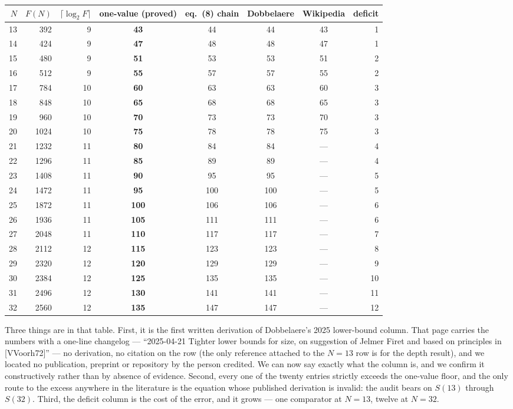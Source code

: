 \documentclass[11pt,a4paper]{article}
\begin{document}
\begin{center}
\footnotesize
\begin{tabular}{r r r c c c c r}
\toprule
$N$ & $F(N)$ & $\lceil\log_2 F\rceil$ & one-value (proved) & eq.~(8) chain
& Dobbelaere \cite{Do25} & Wikipedia \cite{Wik26} & deficit \\
\midrule
13 & 392 & 9 & \textbf{43} & 44 & 44 & 43 & 1 \\
14 & 424 & 9 & \textbf{47} & 48 & 48 & 47 & 1 \\
15 & 480 & 9 & \textbf{51} & 53 & 53 & 51 & 2 \\
16 & 512 & 9 & \textbf{55} & 57 & 57 & 55 & 2 \\
17 & 784 & 10 & \textbf{60} & 63 & 63 & 60 & 3 \\
18 & 848 & 10 & \textbf{65} & 68 & 68 & 65 & 3 \\
19 & 960 & 10 & \textbf{70} & 73 & 73 & 70 & 3 \\
20 & 1024 & 10 & \textbf{75} & 78 & 78 & 75 & 3 \\
21 & 1232 & 11 & \textbf{80} & 84 & 84 & --- & 4 \\
22 & 1296 & 11 & \textbf{85} & 89 & 89 & --- & 4 \\
23 & 1408 & 11 & \textbf{90} & 95 & 95 & --- & 5 \\
24 & 1472 & 11 & \textbf{95} & 100 & 100 & --- & 5 \\
25 & 1872 & 11 & \textbf{100} & 106 & 106 & --- & 6 \\
26 & 1936 & 11 & \textbf{105} & 111 & 111 & --- & 6 \\
27 & 2048 & 11 & \textbf{110} & 117 & 117 & --- & 7 \\
28 & 2112 & 12 & \textbf{115} & 123 & 123 & --- & 8 \\
29 & 2320 & 12 & \textbf{120} & 129 & 129 & --- & 9 \\
30 & 2384 & 12 & \textbf{125} & 135 & 135 & --- & 10 \\
31 & 2496 & 12 & \textbf{130} & 141 & 141 & --- & 11 \\
32 & 2560 & 12 & \textbf{135} & 147 & 147 & --- & 12 \\
\bottomrule
\end{tabular}
\end{center}

Three things are in that table. First, it is the first written derivation of
Dobbelaere's 2025 lower-bound column. That page carries the numbers with a
one-line changelog --- ``2025-04-21 Tighter lower bounds for size, on suggestion
of Jelmer Firet and based on principles in [VVoorh72]'' --- no derivation, no
citation on the row (the only reference attached to the $N=13$ row is for the
depth result), and we located no publication, preprint or repository by the
person credited. We can now say exactly what the column is, and we confirm it
constructively rather than by absence of evidence. Second, every one of the
twenty entries strictly exceeds the one-value floor, and the only route to the
excess anywhere in the literature is the equation whose published derivation is
invalid: the audit bears on $S(13)$ through $S(32)$. Third, the deficit column
is the cost of the error, and it grows --- one comparator at $N=13$, twelve at
$N=32$.
\end{document}
